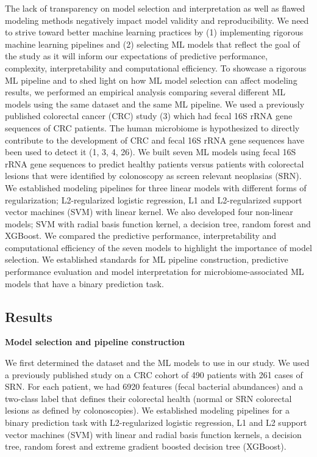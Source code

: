 \documentclass[11pt,]{article}
\begin{document}
The lack of transparency on model selection and interpretation as well
as flawed modeling methods negatively impact model validity and
reproducibility. We need to strive toward better machine learning
practices by (1) implementing rigorous machine learning pipelines and
(2) selecting ML models that reflect the goal of the study as it will
inform our expectations of predictive performance, complexity,
interpretability and computational efficiency. To showcase a rigorous ML
pipeline and to shed light on how ML model selection can affect modeling
results, we performed an empirical analysis comparing several different
ML models using the same dataset and the same ML pipeline. We used a
previously published colorectal cancer (CRC) study (3) which had fecal
16S rRNA gene sequences of CRC patients. The human microbiome is
hypothesized to directly contribute to the development of CRC and fecal
16S rRNA gene sequences have been used to detect it (1, 3, 4, 26). We
built seven ML models using fecal 16S rRNA gene sequences to predict
healthy patients versus patients with colorectal lesions that were
identified by colonoscopy as screen relevant neoplasias (SRN). We
established modeling pipelines for three linear models with different
forms of regularization; L2-regularized logistic regression, L1 and
L2-regularized support vector machines (SVM) with linear kernel. We also
developed four non-linear models; SVM with radial basis function kernel,
a decision tree, random forest and XGBoost. We compared the predictive
performance, interpretability and computational efficiency of the seven
models to highlight the importance of model selection. We established
standards for ML pipeline construction, predictive performance
evaluation and model interpretation for microbiome-associated ML models
that have a binary prediction task.

\subsection{Results}\label{results}

\textbf{Model selection and pipeline construction}

We first determined the dataset and the ML models to use in our study.
We used a previously published study on a CRC cohort of 490 patients
with 261 cases of SRN. For each patient, we had 6920 features (fecal
bacterial abundances) and a two-class label that defines their
colorectal health (normal or SRN colorectal lesions as defined by
colonoscopies). We established modeling pipelines for a binary
prediction task with L2-regularized logistic regression, L1 and L2
support vector machines (SVM) with linear and radial basis function
kernels, a decision tree, random forest and extreme gradient boosted
decision tree (XGBoost).
\end{document}
